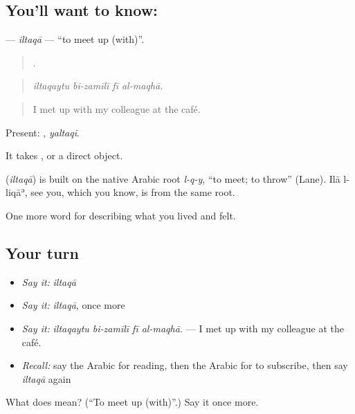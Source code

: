 \subsection*{You'll want to know: }
\textbf{} — \emph{iltaqā} — \textquotedblleft{}to meet up (with)\textquotedblright{}.

\begin{quote}
   .
\end{quote}

\begin{quote}
\emph{iltaqaytu bi-zamīlī fī al-maqhā.}
\end{quote}

\begin{quote}
I met up with my colleague at the café.
\end{quote}

Present: , \emph{yaltaqī}.

It takes , or a direct object.

\begin{cousinweb}
\textbf{} (\emph{iltaqā}) is built on the native Arabic root \emph{l-q-y}, \textquotedblleft{}to meet; to throw\textquotedblright{} (Lane). Ilā l-liqāʾ, see you, which you know, is from the same root.
\end{cousinweb}

\begin{grammarlens}[title={What you've built}]
One more word for describing what you lived and felt.
\end{grammarlens}

\subsection*{Your turn}
\begin{itemize}
\raggedright
  \item \emph{Say it:} \emph{iltaqā}
  \item \emph{Say it:} \emph{iltaqā}, once more
  \item \emph{Say it:} \emph{iltaqaytu bi-zamīlī fī al-maqhā.} — I met up with my colleague at the café.
  \item \emph{Recall:} say the Arabic for reading, then the Arabic for to subscribe, then say \emph{iltaqā} again
\end{itemize}

\begin{tcolorbox}[breakable,colback=teal!4,colframe=teal!35!black,title={Before you move on}]
What does  mean? (\textquotedblleft{}To meet up (with)\textquotedblright{}.) Say it once more.
\end{tcolorbox}
